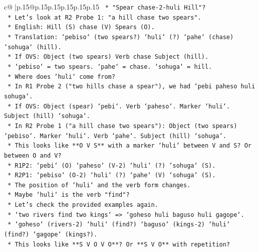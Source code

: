 \documentclass{article}
\begin{document}
{\begin{supertabular}{c@{$\;$}|p{.15\linewidth}@{}p{.15\linewidth}p{.15\linewidth}p{.15\linewidth}p{.15\linewidth}p{.15\linewidth}}
{{{\texttt{                    *   "Spear chase{-}2{-}huli Hill"?} \\
\texttt{                    *   Let's look at R2 Probe 1: "a hill chase two spears".} \\
\texttt{                        *   English: Hill (S) chase (V) Spears (O).} \\
\texttt{                        *   Translation: `pebiso` (two spears?) `huli` (?) `pahe` (chase) `sohuga` (hill).} \\
\texttt{                        *   If OVS: Object (two spears) Verb chase Subject (hill).} \\
\texttt{                        *   `pebiso` = two spears. `pahe` = chase. `sohuga` = hill.} \\
\texttt{                        *   Where does `huli` come from?} \\
\texttt{                        *   In R1 Probe 2 ("two hills chase a spear"), we had `pebi paheso huli sohuga`.} \\
\texttt{                        *   If OVS: Object (spear) `pebi`. Verb `paheso`. Marker `huli`. Subject (hill) `sohuga`.} \\
\texttt{                        *   In R2 Probe 1 ("a hill chase two spears"): Object (two spears) `pebiso`. Marker `huli`. Verb `pahe`. Subject (hill) `sohuga`.} \\
\texttt{                        *   This looks like **O V S** with a marker `huli` between V and S? Or between O and V?} \\
\texttt{                        *   R1P2: `pebi` (O) `paheso` (V{-}2) `huli` (?) `sohuga` (S).} \\
\texttt{                        *   R2P1: `pebiso` (O{-}2) `huli` (?) `pahe` (V) `sohuga` (S).} \\
\texttt{                        *   The position of `huli` and the verb form changes.} \\
\texttt{                        *   Maybe `huli` is the verb "find"?} \\
\texttt{                        *   Let's check the provided examples again.} \\
\texttt{                        *   `two rivers find two kings` => `goheso huli baguso huli gagope`.} \\
\texttt{                            *   `goheso` (rivers{-}2) `huli` (find?) `baguso` (kings{-}2) `huli` (find?) `gagope` (kings?).} \\
\texttt{                            *   This looks like **S V O V O**? Or **S V O** with repetition?} \\
}}}
\end{supertabular}}
\end{document}
